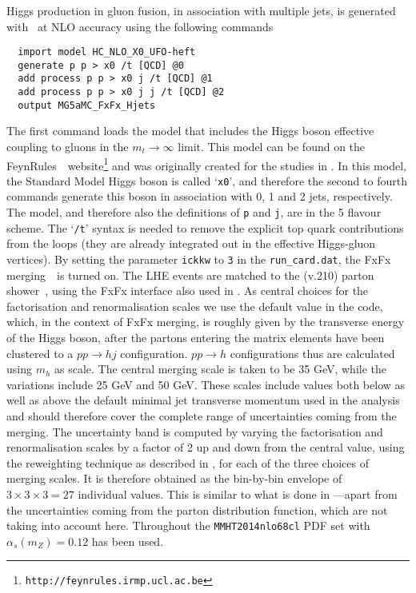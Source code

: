 \subsubsection{\MGaMC}
\label{sec:hjetscomp:tools:mc:mg5amc}

Higgs production in gluon fusion, in association with multiple jets,
is generated with \MGaMC \cite{Alwall:2014hca}~at NLO
accuracy using the following commands
\begin{verbatim}
  import model HC_NLO_X0_UFO-heft
  generate p p > x0 /t [QCD] @0
  add process p p > x0 j /t [QCD] @1
  add process p p > x0 j j /t [QCD] @2
  output MG5aMC_FxFx_Hjets
\end{verbatim}
The first command loads the model that includes the Higgs boson
effective coupling to gluons in the $m_t\to\infty$ limit. This model
can be found on the
FeynRules~\cite{Alloul:2013bka}~website\footnote{\texttt{http://feynrules.irmp.ucl.ac.be}}
and was originally created for the studies in
\cite{Demartin:2014fia}. In this model, the Standard Model Higgs
boson is called `\texttt{x0}', and therefore the second to fourth
commands generate this boson in association with 0, 1 and 2 jets,
respectively. The model, and therefore also the definitions of
\texttt{p} and \texttt{j}, are in the 5 flavour scheme. The
`\texttt{/t}' syntax is needed to remove the explicit top quark
contributions from the loops (they are already integrated out in the
effective Higgs-gluon vertices). By setting the parameter
\texttt{ickkw} to \texttt{3} in the \texttt{run\_card.dat}, the FxFx
merging~\cite{Frederix:2012ps}~is turned on. The LHE events are
matched to the  (v.210) parton
shower~\cite{Sjostrand:2014zea}, using the FxFx interface also used in
\cite{Frederix:2015eii}. As central choices for the factorisation
and renormalisation scales we use the default value in the
\MGaMC code, which, in the context of FxFx merging, is
roughly given by the transverse energy of the Higgs boson, after the
partons entering the matrix elements have been clustered to a $pp \to h
j$ configuration. $pp\to h$ configurations thus are calculated using 
$m_h$ as scale. The central merging scale is taken to be 35 GeV,
while the variations include 25 GeV and 50 GeV. These scales include 
values both below as well as above the default minimal jet transverse
momentum used in the analysis and should therefore cover the complete
range of uncertainties coming from the merging.  The uncertainty band
is computed by varying the factorisation and renormalisation scales by
a factor of 2 up and down from the central value, using the reweighting
technique as described in \cite{Frederix:2011ss}, for each of the
three choices of merging scales. It is therefore obtained
as the bin-by-bin envelope of $3 \times 3 \times 3 = 27$ individual
values. This is similar to what is done in
\cite{Frederix:2015eii}---apart from the uncertainties coming
from the parton distribution function, which are not taking into
account here. Throughout the \texttt{MMHT2014nlo68cl} PDF set with 
$\alpha_s(m_Z)=0.12$ has been used.
